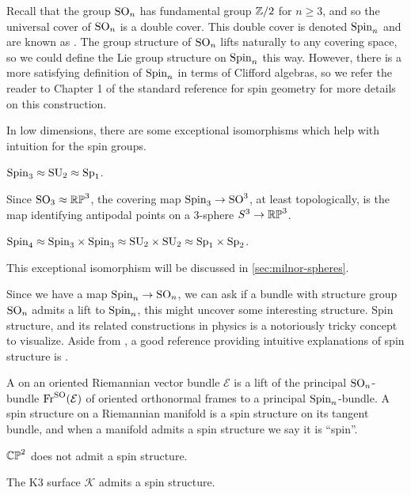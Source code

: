 Recall that the group $\mathrm{SO}_n$ has fundamental group $\mathbb{Z}/2$ for $n\geq 3$, and so the universal cover of $\mathrm{SO}_n$ is a double cover. This double cover is denoted $\mathrm{Spin}_n$ and are known as . The group structure of $\mathrm{SO}_n$ lifts naturally to any covering space, so we could define the Lie group structure on $\mathrm{Spin}_n$ this way. However, there is a more satisfying definition of $\mathrm{Spin}_n$ in terms of Clifford algebras, so we refer the reader to Chapter 1 of the standard reference for spin geometry \cite{lawson1989spin} for more details on this construction.

In low dimensions, there are some exceptional isomorphisms which help with intuition for the spin groups.
\begin{example}
	$\mathrm{Spin}_3\approx \mathrm{SU}_2\approx \mathrm{Sp}_1$.

	Since $\mathrm{SO}_3\approx \mathbb{RP}^3$, the covering map $\mathrm{Spin}_3 \to \mathrm{SO}^3$, at least topologically, is the map identifying antipodal points on a $3$-sphere $S^3\to \mathbb{RP}^3$.
\end{example}
\begin{example}
	$\mathrm{Spin}_4\approx \mathrm{Spin}_3\times\mathrm{Spin}_3\approx \mathrm{SU}_2\times \mathrm{SU}_2\approx \mathrm{Sp}_1\times \mathrm{Sp}_2$.

	This exceptional isomorphism will be discussed in \cref{sec:milnor-spheres}.
\end{example}

Since we have a map $\mathrm{Spin}_n \to \mathrm{SO}_n$, we can ask if a bundle with structure group $\mathrm{SO}_n$ admits a lift to $\mathrm{Spin}_n$, this might uncover some interesting structure. Spin structure, and its related constructions in physics is a notoriously tricky concept to visualize. Aside from \cite{lawson1989spin}, a good reference providing intuitive explanations of spin structure is \cite{nakahara2003}.

\begin{definition}
	A  on an oriented Riemannian vector bundle $\mathcal{E}$ is a lift of the principal $\mathrm{SO}_n$-bundle $\operatorname{Fr}^{\mathrm{SO}}(\mathcal{E})$ of oriented orthonormal frames to a principal $\mathrm{Spin}_n$-bundle. A spin structure on a Riemannian manifold is a spin structure on its tangent bundle, and when a manifold admits a spin structure we say it is ``spin''.
\end{definition}

\begin{example}
	$\mathbb{CP}^2$ does not admit a spin structure.
\end{example}

\begin{example}
	The K3 surface $\mathcal{K}$ admits a spin structure.
\end{example}

